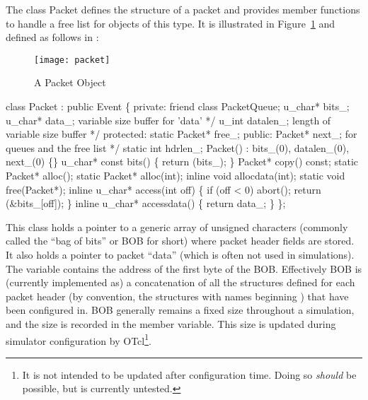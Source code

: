 The class Packet defines the structure of a
packet and provides member functions to handle a
free list for objects of this type.
It is illustrated in Figure~\ref{pic:packet} and
defined as follows in :
\begin{figure}[h]
  \centerline{\texttt{[image: packet]}}
  \caption{A Packet Object}
  \label{pic:packet}
\end{figure}
\begin{program}
        class Packet : public Event \{
        private:
                friend class PacketQueue;
                u_char* bits_;  
                u_char* data_;  \* variable size buffer for 'data' */
                u_int datalen_; \* length of variable size buffer */
        protected:
                static Packet* free_;
        public: 
                Packet* next_;  \* for queues and the free list */
                static int hdrlen_;
                Packet() : bits_(0), datalen_(0), next_(0) \{\}
                u_char* const bits() \{ return (bits_); \}
                Packet* copy() const;
                static Packet* alloc();
                static Packet* alloc(int);
                inline void allocdata(int);
                static void free(Packet*);
                inline u_char* access(int off) \{
                        if (off < 0)
                                abort();
                        return (&bits_[off]);
                \}  
                inline u_char* accessdata() \{ return data_; \}
        \};
\end{program}
This class holds a pointer to a generic array of unsigned
characters (commonly called the ``bag of bits'' or BOB for short)
where packet header fields are stored.
It also holds a pointer to packet ``data'' (which is often not used in
simulations).
The  variable contains the address of
the first byte of the BOB.
Effectively BOB is (currently implemented as) a concatenation
of all the structures defined for each packet header (by convention,
the structures with names beginning ) that have
been configured in.
BOB generally remains a fixed size throughout a simulation, and
the size is recorded in the  member
variable.
This size is updated during simulator configuration by
OTcl\footnote{It is not intended to be updated after configuration
time.  Doing so {\em should} be possible, but is currently untested.}.

